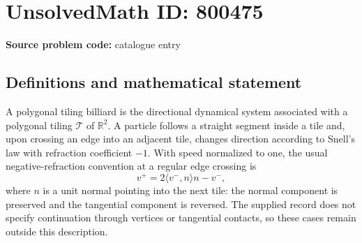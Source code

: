 \documentclass[11pt]{article}
\newcommand{\R}{\mathbb{R}}
\begin{document}
\section*{UnsolvedMath ID: 800475}
\textbf{Source problem code:} catalogue entry
\subsection{Definitions and mathematical statement}
A polygonal tiling billiard is the directional dynamical system associated with a polygonal tiling \(\mathcal T\) of \(\R^2\). A particle follows a straight segment inside a tile and, upon crossing an edge into an adjacent tile, changes direction according to Snell's law with refraction coefficient \(-1\). With speed normalized to one, the usual negative-refraction convention at a regular edge crossing is
\[
 v^+=2\langle v^-,n\rangle n-v^-,
\]
where \(n\) is a unit normal pointing into the next tile: the normal component is preserved and the tangential component is reversed. The supplied record does not specify continuation through vertices or tangential contacts, so these cases remain outside this description.
\end{document}
